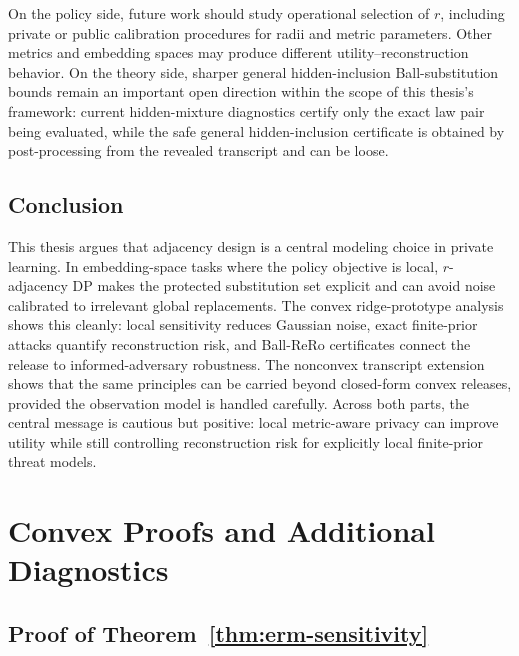 \documentclass[11pt,a4paper]{report}
\theoremstyle{plain}
\theoremstyle{definition}
\theoremstyle{remark}
\begin{document}
On the policy side, future work should study operational selection of $r$, including private or public calibration procedures for radii and metric parameters.  Other metrics and embedding spaces may produce different utility--reconstruction behavior.  On the theory side, sharper general hidden-inclusion Ball-substitution bounds remain an important open direction within the scope of this thesis's framework: current hidden-mixture diagnostics certify only the exact law pair being evaluated, while the safe general hidden-inclusion certificate is obtained by post-processing from the revealed transcript and can be loose.

\section{Conclusion}
\label{sec:final-conclusion}

This thesis argues that adjacency design is a central modeling choice in private learning.  In embedding-space tasks where the policy objective is local, $r$-adjacency DP makes the protected substitution set explicit and can avoid noise calibrated to irrelevant global replacements.  The convex ridge-prototype analysis shows this cleanly: local sensitivity reduces Gaussian noise, exact finite-prior attacks quantify reconstruction risk, and Ball-ReRo certificates connect the release to informed-adversary robustness.  The nonconvex transcript extension shows that the same principles can be carried beyond closed-form convex releases, provided the observation model is handled carefully.  Across both parts, the central message is cautious but positive: local metric-aware privacy can improve utility while still controlling reconstruction risk for explicitly local finite-prior threat models.

\appendix

\chapter{Convex Proofs and Additional Diagnostics}
\label{app:convex-proofs}

\section{Proof of Theorem~\ref{thm:erm-sensitivity}}
\label{app:proof-erm-sensitivity}
\end{document}
